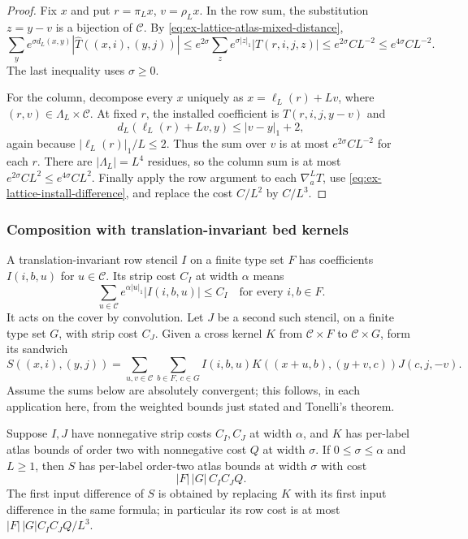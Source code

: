 \begin{proof}
Fix $x$ and put $r=\pi_Lx$, $v=\rho_Lx$. In the row sum, the substitution
$z=y-v$ is a bijection of $\mathcal C$. By
\eqref{eq:ex-lattice-atlas-mixed-distance},
\[
 \sum_y e^{\sigma d_L(x,y)}|\widehat T((x,i),(y,j))|
 \leq e^{2\sigma}\sum_z e^{\sigma|z|_1}|T(r,i,j,z)|
 \leq e^{2\sigma} C L^{-2}
 \leq e^{4\sigma} C L^{-2}.
\]
The last inequality uses $\sigma\geq0$.

For the column, decompose every $x$ uniquely as $x=\ell_L(r)+Lv$,
where $(r,v)\in\Lambda_L\times\mathcal C$. At fixed $r$, the installed
coefficient is $T(r,i,j,y-v)$ and
\[
 d_L(\ell_L(r)+Lv,y)
 \leq |v-y|_1+2,
\]
again because $|\ell_L(r)|_1/L\leq2$. Thus the sum over $v$ is at most
$e^{2\sigma}CL^{-2}$ for each $r$. There are $|\Lambda_L|=L^4$ residues,
so the column sum is at most $e^{2\sigma}CL^2\leq e^{4\sigma}CL^2$.
Finally apply the row argument to each $\nabla_a^LT$, use
\eqref{eq:ex-lattice-install-difference}, and replace the cost $C/L^2$
by $C/L^3$.
\end{proof}

\subsubsection{Composition with translation-invariant bed kernels}

A translation-invariant row stencil $I$ on a finite type set $F$ has
coefficients $I(i,b,u)$ for $u\in\mathcal C$. Its strip cost $C_I$ at
width $\alpha$ means
\[
 \sum_{u\in\mathcal C}e^{\alpha|u|_1}|I(i,b,u)|\leq C_I
 \quad\text{for every }i,b\in F.
\]
It acts on the cover by convolution. Let $J$ be a second such stencil, on a
finite type set $G$, with strip cost $C_J$. Given a cross kernel $K$ from
$\mathcal C\times F$ to $\mathcal C\times G$, form its sandwich
\[
 S((x,i),(y,j))=
 \sum_{u,v\in\mathcal C}\sum_{b\in F,\,c\in G}
 I(i,b,u)K((x+u,b),(y+v,c))J(c,j,-v).
\]
Assume the sums below are absolutely convergent; this follows, in each
application here, from the weighted bounds just stated and Tonelli's theorem.

\begin{lemma}
\label{lem:ex-lattice-sandwich-atlas}
Suppose $I,J$ have nonnegative strip costs $C_I,C_J$ at width $\alpha$, and $K$ has
per-label atlas bounds of order two with nonnegative cost $Q$ at width
$\sigma$. If $0\leq\sigma\leq\alpha$ and $L\geq1$, then $S$ has per-label order-two
atlas bounds at width $\sigma$ with cost
\[
 |F|\,|G|\,C_I C_J Q.
\]
The first input difference of $S$ is obtained by replacing $K$ with its first
input difference in the same formula; in particular its row cost is at most
$|F|\,|G|C_I C_J Q/L^3$.
\end{lemma}

